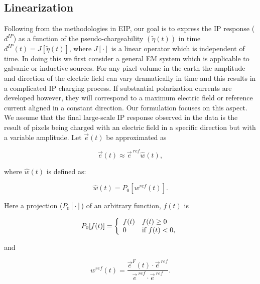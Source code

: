 \documentclass[letterpaper,11pt]{article}
\newcommand {\e}  { {\vec e} }
\newcommand{\peta}{\tilde{\eta}}
\newcommand{\eref}{\e^{\ ref}}
\newcommand{\dip}{d^{IP}}
\begin{document}
\subsection{Linearization}
Following from the methodologies in EIP, our goal is to express the IP response ($\dip$) as a function of the pseudo-chargeability $(\peta(t))$ in time  $\dip(t) = J[\peta(t)]$, where $J[\cdot]$ is a linear operator which is independent of time. In doing this we first consider a general EM system which is applicable to galvanic or inductive sources. 
For any pixel  volume in the earth the amplitude and direction of the  electric field can vary dramatically  in time and this results in a complicated  IP charging process. If substantial polarization currents are developed however, they will correspond to a maximum electric field or reference current aligned in a constant direction. Our formulation focuses on this aspect. We assume that the final large-scale IP response observed in the data is the result of  pixels being charged with an electric field in a specific direction but with a variable amplitude. Let $\e(t)$ be approximated as
\begin{linenomath*}
\begin{equation}
  \e(t) \approx \eref \hat{w}(t),
  \label{eq: e_with_eref}
\end{equation}
\end{linenomath*}
where $\hat{w}(t)$ is defined as:
\begin{linenomath*}
\begin{equation}
  \hat{w}(t) = P_0[w^{ref}(t)].
  \label{eq: we}
\end{equation}
\end{linenomath*}
Here a projection ($P_0[\cdot]$) of an arbitrary function, $f(t)$ is
\begin{linenomath*}
\begin{equation}
  P_0[f(t)] = \left\{ 
  \begin{array}{l l}
    f(t) & f(t) \ge 0 \\
    0 & \text{if } f(t) < 0, 
  \end{array}\right.
  \label{eq: P0}
\end{equation}
\end{linenomath*}
and
\begin{linenomath*}
\begin{equation}
  w^{ref}(t) = \frac{\e^F(t)\cdot\eref}{\eref\cdot\eref}.
  \label{eq: wref}
\end{equation}
\end{linenomath*}
\end{document}
